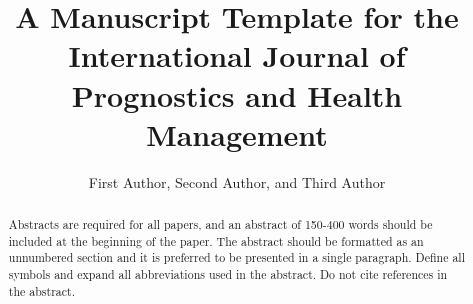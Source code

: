 \documentclass[IJPHM, 2014, 00]{PHMSociety}
\begin{document}
\title{A Manuscript Template for the International Journal of Prognostics and Health Management}

\author{%
	First Author, Second Author, and Third Author
}

\address{%
	\tabularnewline %
}



\maketitle
\pagestyle{fancy}
\thispagestyle{plain}




\begin{abstract}%
Abstracts are required for all papers, and an abstract of 150-400 words should be included at the beginning of the paper. The abstract should be formatted as an unnumbered section and it is preferred to be presented in a single paragraph. Define all symbols and expand all abbreviations used in the abstract. Do not cite references in the abstract.
\end{abstract}
\end{document}
